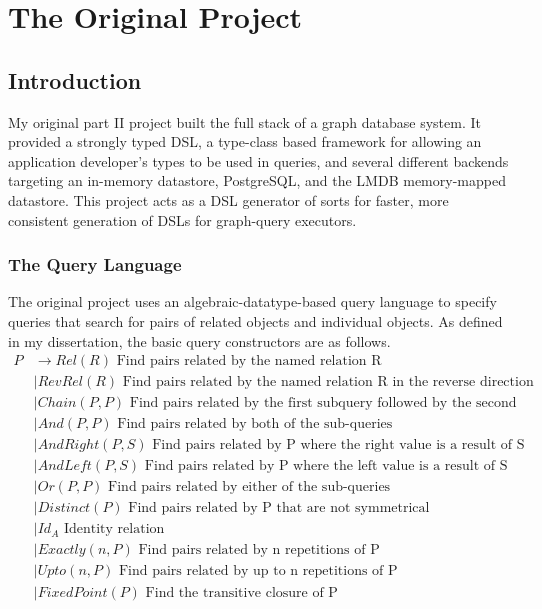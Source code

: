 \documentclass{report}
\newcommand \2[0]{\textbf{2}}
\newcommand \3[0]{\textbf{3}}
\begin{document}
\tableofcontents
\newpage

\chapter{The Original Project}
\section{Introduction}
My original part II project built the full stack of a graph database system. It provided a strongly typed DSL, a type-class based framework for allowing an application developer's types to be used in queries, and several different backends targeting an in-memory datastore, PostgreSQL, and the LMDB memory-mapped datastore. This project acts as a DSL generator of sorts for faster, more consistent generation of  DSLs for graph-query executors.
\subsection{The Query Language}
The original project uses an algebraic-datatype-based query language to specify queries that search for pairs of related objects and individual objects. As defined in my dissertation, the basic query constructors are as follows.
\begin{equation}
    \label{PDefinition}
    \begin{split}
    P  &\rightarrow Rel(R) \mbox{ Find pairs related by the named relation R}\\
    &\mid RevRel(R) \mbox{ Find pairs related by the named relation R in the reverse direction}\\
    &\mid Chain(P, P) \mbox{   Find pairs related by the first subquery followed by the second}\\
    &\mid And(P, P) \mbox{  Find pairs related by both of the sub-queries}\\
    &\mid AndRight(P, S) \mbox{  Find pairs related by P where the right value is a result of S}\\
    &\mid AndLeft(P, S) \mbox{  Find pairs related by P where the left value is a result of S}\\
    &\mid Or(P, P) \mbox{  Find pairs related by either of the sub-queries}\\
    &\mid Distinct(P) \mbox{  Find pairs related by P that are not symmetrical}\\
    &\mid Id_A \mbox{ Identity relation}\\
    &\mid Exactly(\mathit{n}, P) \mbox{  Find pairs related by n repetitions of P}\\
    &\mid Upto(\mathit{n}, P) \mbox{  Find pairs related by up to n repetitions of P}\\
    &\mid FixedPoint(P) \mbox{  Find the transitive closure of P}\\
    \end{split}
    \end{equation} 
\end{document}
